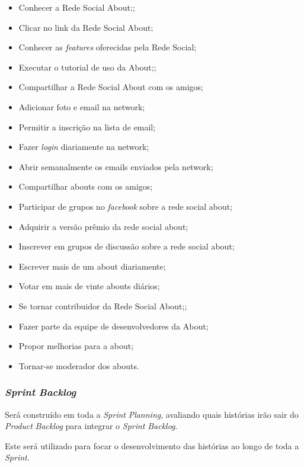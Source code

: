 \begin{itemize}
    \item Conhecer a Rede Social About;;
    \item Clicar no link da Rede Social About;
    \item Conhecer as \textit{features} oferecidas pela Rede Social;
    \item Executar o tutorial de uso da About;;
    \item Compartilhar a Rede Social About com os amigos;
    \item Adicionar foto e email na network;
    \item Permitir a inscrição na lista de email;
    \item Fazer \textit{login} diariamente na network;
    \item Abrir semanalmente os emails enviados pela network;
    \item Compartilhar abouts com os amigos;
    \item Participar de grupos no \textit{facebook} sobre a rede social about;
    \item Adquirir a versão prêmio da rede social about;
    \item Inscrever em grupos de discussão sobre a rede social about;
    \item Escrever mais de um about diariamente;
    \item Votar em mais de vinte abouts diários;
    \item Se tornar contribuidor da Rede Social About;;
    \item Fazer parte da equipe de desenvolvedores da About;
    \item Propor melhorias para a about;
    \item Tornar-se moderador dos abouts.
\end{itemize}


\subsubsection{\textit{Sprint} \textit{Backlog}}
\label{subsec:sprintbacklog}
Será construído em toda a \textit{Sprint} \textit{Planning}, avaliando quais histórias irão
sair do \textit{Product} \textit{Backlog} para integrar o \textit{Sprint} \textit{Backlog}.

Este será utilizado para focar o desenvolvimento das histórias ao longo de
toda a \textit{Sprint}.
